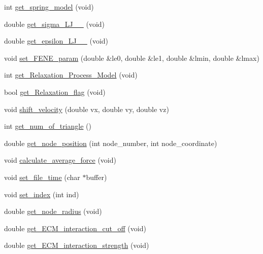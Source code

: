 \begin{DoxyCompactItemize}
\item 
int \mbox{\hyperlink{classMembrane_aa567e00a8c4c4b4a57547b84e80e418e}{get\+\_\+spring\+\_\+model}} (void)
\item 
double \mbox{\hyperlink{classMembrane_af24a7560c8a747fc22c0f21358373334}{get\+\_\+sigma\+\_\+\+L\+J\+\_\+\_}} (void)
\item 
double \mbox{\hyperlink{classMembrane_a7546dc8ac92366b2d485e8088e05af9e}{get\+\_\+epsilon\+\_\+\+L\+J\+\_\+\_}} (void)
\item 
void \mbox{\hyperlink{classMembrane_ae240d9a481d914b7e5092bb9183aa0fa}{set\+\_\+\+F\+E\+N\+E\+\_\+param}} (double \&le0, double \&le1, double \&lmin, double \&lmax)
\item 
int \mbox{\hyperlink{classMembrane_adb66c58c9e5a24936c5ac2ec9bd42290}{get\+\_\+\+Relaxation\+\_\+\+Process\+\_\+\+Model}} (void)
\item 
bool \mbox{\hyperlink{classMembrane_a992f7a356099ef58417254d8218fe357}{get\+\_\+\+Relaxation\+\_\+flag}} (void)
\item 
void \mbox{\hyperlink{classMembrane_a2fb1efa5e780590d62530cc31c8e6b07}{shift\+\_\+velocity}} (double vx, double vy, double vz)
\item 
int \mbox{\hyperlink{classMembrane_a2ab5e9ec0ae823cfa224be4db90e11c5}{get\+\_\+num\+\_\+of\+\_\+triangle}} ()
\item 
double \mbox{\hyperlink{classMembrane_a72b951cd255e853e51db5dcaa0bfc9d5}{get\+\_\+node\+\_\+position}} (int node\+\_\+number, int node\+\_\+coordinate)
\item 
void \mbox{\hyperlink{classMembrane_a696ec76d17d33335f2c41aa498485e56}{calculate\+\_\+average\+\_\+force}} (void)
\item 
void \mbox{\hyperlink{classMembrane_a6b74827fd9dc653001b7cd6315b065a2}{set\+\_\+file\+\_\+time}} (char $\ast$buffer)
\item 
void \mbox{\hyperlink{classMembrane_aaf51e7b1813da0f499d36664d7486db7}{set\+\_\+index}} (int ind)
\item 
double \mbox{\hyperlink{classMembrane_a55c6aba6d26420c0796841125e2a6b98}{get\+\_\+node\+\_\+radius}} (void)
\item 
double \mbox{\hyperlink{classMembrane_a7e615d274c66563e37113d33a53d3a0b}{get\+\_\+\+E\+C\+M\+\_\+interaction\+\_\+cut\+\_\+off}} (void)
\item 
double \mbox{\hyperlink{classMembrane_a21875eb94e7bce97b45bd18b3461d8fc}{get\+\_\+\+E\+C\+M\+\_\+interaction\+\_\+strength}} (void)
\item 

\end{DoxyCompactItemize}
